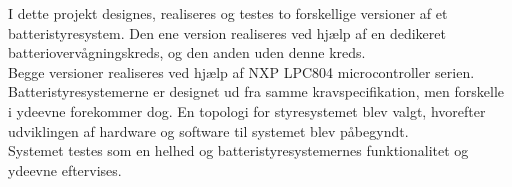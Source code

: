 I dette projekt designes, realiseres og testes to forskellige versioner af et batteristyresystem. Den ene version realiseres ved hjælp af en dedikeret batteriovervågningskreds, og den anden uden denne kreds.
\\

Begge versioner realiseres ved hjælp af NXP LPC804 microcontroller serien. Batteristyresystemerne er designet ud fra samme kravspecifikation, men forskelle i ydeevne forekommer dog. En topologi for styresystemet blev valgt, hvorefter udviklingen af hardware og software til systemet blev påbegyndt.
\\

Systemet testes som en helhed og batteristyresystemernes funktionalitet og ydeevne eftervises.